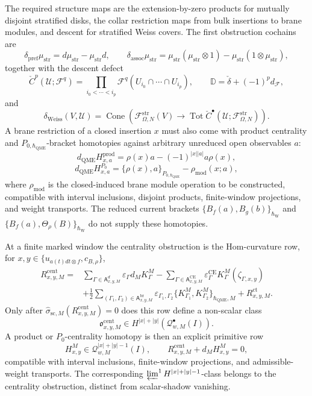 \begin{enumerate}
  The required structure maps are the extension-by-zero products for
  mutually disjoint stratified disks, the collar restriction maps from
  bulk insertions to brane modules, and descent for stratified Weiss
  covers.  The first obstruction cochains are
  \[
    \delta_{\mathrm{pref}}\mu_{\mathrm{str}}
      =
      d\mu_{\mathrm{str}}
      -\mu_{\mathrm{str}}d,\qquad
    \delta_{\mathrm{assoc}}\mu_{\mathrm{str}}
      =
      \mu_{\mathrm{str}}(\mu_{\mathrm{str}}\otimes1)
      -\mu_{\mathrm{str}}(1\otimes\mu_{\mathrm{str}}),
  \]
  together with the descent defect
  \[
    \check C^p(\mathcal U;\mathcal F^q)
    =
    \prod_{i_0<\cdots<i_p}
    \mathcal F^q(U_{i_0}\cap\cdots\cap U_{i_p}),
    \qquad
    \mathbb D=\check\delta+(-1)^p d_{\mathcal F},
  \]
  and
  \[
    \delta_{\mathrm{Weiss}}(V,\mathcal U)
    =
    \operatorname{Cone}\left(
      \mathcal F^{\mathrm{str}}_{\Omega,N}(V)
      \to
      \operatorname{Tot}\check C^\bullet
      (\mathcal U;\mathcal F^{\mathrm{str}}_{\Omega,N})
    \right).
  \]
  A brane restriction of a closed insertion \(x\) must also come with
  product centrality and \(P_{0,\hbar_{\mathrm{QME}}}\)-bracket homotopies against
  arbitrary unreduced open observables \(a\):
  \[
    d_{\mathrm{QME}}H^{\mathrm{prod}}_{x,a}
      =
      \rho(x)a-(-1)^{|x||a|}a\rho(x),
  \]
  \[
    d_{\mathrm{QME}}H^{P_0}_{x,a}
      =
      \{\rho(x),a\}_{P_{0,\hbar_{\mathrm{QME}}}}
      -\rho_{\mathrm{mod}}(x;a),
  \]
  where \(\rho_{\mathrm{mod}}\) is the closed-induced brane module
  operation to be constructed, compatible with interval inclusions,
  disjoint products, finite-window projections, and weight transports.
  The reduced current brackets
  \(\{B_f(a),B_g(b)\}_{\hbar_{\mathrm{W}}}\) and
  \(\{B_f(a),\Theta_\rho(B)\}_{\hbar_{\mathrm{W}}}\) do not supply
  these homotopies.

  At a finite marked window the centrality obstruction is the Hom-curvature
  row, for
  \(x,y\in\{u_{a(t)dt\otimes f},c_{B,\rho}\}\),
  \[
  \begin{aligned}
    R^{\mathrm{cent}}_{x,y,M}
      ={}&
      \sum_{\Gamma\in\mathsf A^{d}_{x,y,M}}
        \varepsilon_\Gamma d_MK^M_\Gamma
      -\sum_{\Gamma\in\mathsf A^{\mathrm{CE}}_{x,y,M}}
        \varepsilon^{\mathrm{CE}}_\Gamma
        K^M_\Gamma(\zeta_{\Gamma,x,y})\\
      &+\frac12
      \sum_{(\Gamma_1,\Gamma_2)\in\mathsf A^{\mathrm{br}}_{x,y,M}}
        \varepsilon_{\Gamma_1,\Gamma_2}
        \{K^M_{\Gamma_1},K^M_{\Gamma_2}\}_{\hbar_{\mathrm{QME}},M}
      +R^{\mathrm{ct}}_{x,y,M}.
  \end{aligned}
  \]
  Only after
  \(\widehat\sigma_{\mathrm{sc},M}(R^{\mathrm{cent}}_{x,y,M})=0\)
  does this row define a non-scalar class
  \[
    \mathfrak o^{\mathrm{cent}}_{x,y,M}
      \in
    H^{|x|+|y|}(\mathcal Q^\bullet_{w,M}(I)).
  \]
  A product or \(P_0\)-centrality homotopy is then an explicit primitive
  row
  \[
    H^M_{x,y}\in\mathcal Q^{|x|+|y|-1}_{w,M}(I),
    \qquad
    R^{\mathrm{cent}}_{x,y,M}+d_MH^M_{x,y}=0,
  \]
  compatible with interval inclusions, finite-window projections, and
  admissible-weight transports.  The corresponding
  \(\varprojlim^1 H^{|x|+|y|-1}\)-class belongs to the centrality
  obstruction, distinct from scalar-shadow vanishing.


\end{enumerate}
